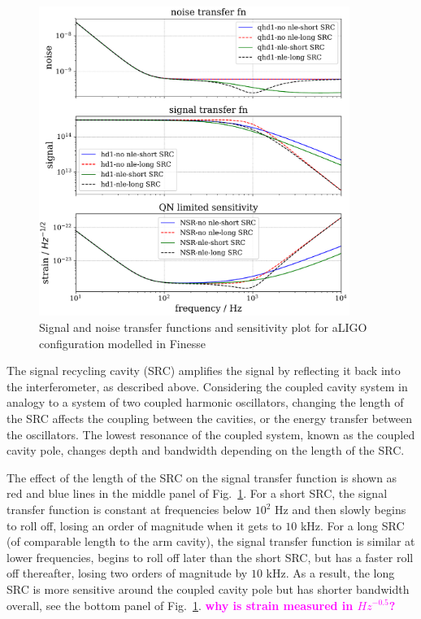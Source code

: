 \documentclass[aps,pra,superscriptaddress,reprint,nofootinbib]{revtex4-1}
\newcommand{\jam}[1]{\textcolor{magenta}{\textbf{#1}}}
\begin{document}
\begin{figure}
	\begin{center}
	\includegraphics[width=0.9\textwidth]{figures/aLIGO_transfer_fns_and_sensitivity_comparison.pdf}
	\end{center}
	\caption{Signal and noise transfer functions and sensitivity plot for aLIGO configuration modelled in Finesse}
	\label{fig:src_transfer_functions}
\end{figure}

The signal recycling cavity (SRC) amplifies the signal by reflecting it back into the interferometer, as described above.
Considering the coupled cavity system in analogy to a system of two coupled harmonic oscillators, changing the length of the SRC affects the coupling between the cavities, or the energy transfer between the oscillators. The lowest resonance of the coupled system, known as the coupled cavity pole, changes depth and bandwidth depending on the length of the SRC.


The effect of the length of the SRC on the signal transfer function is shown as red and blue lines in the middle panel of Fig.~\ref{fig:src_transfer_functions}.
For a short SRC, the signal transfer function is constant at frequencies below $10^2$ Hz and then slowly begins to roll off, losing an order of magnitude when it gets to $10$ kHz. For a long SRC (of comparable length to the arm cavity), the signal transfer function is similar at lower frequencies, begins to roll off later than the short SRC, but has a faster roll off thereafter, losing two orders of magnitude by $10$ kHz. As a result, the long SRC is more sensitive around the coupled cavity pole but has shorter bandwidth overall, see the bottom panel of Fig.~\ref{fig:src_transfer_functions}.
\jam{why is strain measured in $Hz^{-0.5}$?}
\end{document}
